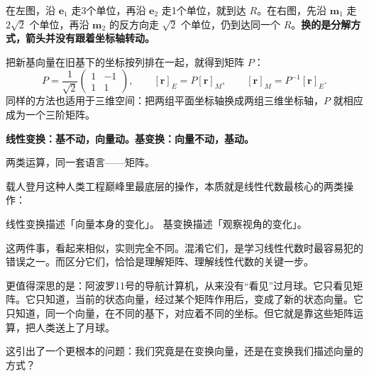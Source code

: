\documentclass[a4paper,12pt,twoside,openany,fontset=none]{ctexbook}
\numberwithin{equation}{chapter}
\begin{document}
在左图，沿 $\boldsymbol e_1$ 走3个单位，再沿 $\boldsymbol e_2$ 走1个单位，就到达 $R$。在右图，先沿 $\boldsymbol m_1$ 走 $2\sqrt2$ 个单位，再沿 $\boldsymbol m_2$ 的反方向走 $\sqrt2$ 个单位，仍到达同一个 $R$。\textbf{换的是分解方式，箭头并没有跟着坐标轴转动。}

把新基向量在旧基下的坐标按列排在一起，就得到矩阵 $P$：
\[
 P=\frac1{\sqrt2}\begin{pmatrix}1&-1\\1&1\end{pmatrix},\qquad
 [\boldsymbol r]_E=P[\boldsymbol r]_M,\qquad
 \boxed{[\boldsymbol r]_M=P^{-1}[\boldsymbol r]_E}.
\]
同样的方法也适用于三维空间：把两组平面坐标轴换成两组三维坐标轴，$P$ 就相应成为一个三阶矩阵。


\par\vspace{5pt}\noindent\begin{minipage}{\linewidth}
\centering\bfseries\color{FourWarm}
线性变换：基不动，向量动。\qquad 基变换：向量不动，基动。\par
\vspace{5pt}两类运算，同一套语言——矩阵。
\end{minipage}

\par{}
载人登月这种人类工程巅峰里最底层的操作，本质就是线性代数最核心的两类操作：

线性变换描述「向量本身的变化」。 基变换描述「观察视角的变化」。

这两件事，看起来相似，实则完全不同。混淆它们，是学习线性代数时最容易犯的错误之一。而区分它们，恰恰是理解矩阵、理解线性代数的关键一步。

更值得深思的是：阿波罗11号的导航计算机，从来没有“看见”过月球。它只看见矩阵。它只知道，当前的状态向量，经过某个矩阵作用后，变成了新的状态向量。它只知道，同一个向量，在不同的基下，对应着不同的坐标。但它就是靠这些矩阵运算，把人类送上了月球。

这引出了一个更根本的问题：我们究竟是在变换向量，还是在变换我们描述向量的方式？
\end{document}
